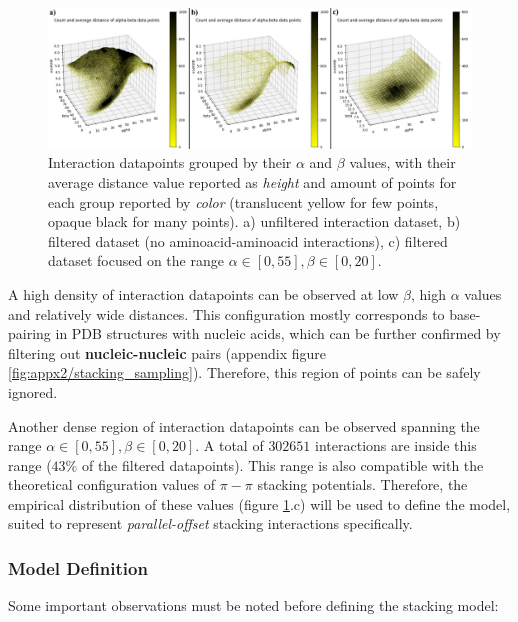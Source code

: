       \begin{figure}[H]
        \centering
        \includegraphics[width=1\textwidth]{figures/results/stacking_sampling.png}
        \caption{\label{fig:results/stacking_sampling} Interaction datapoints grouped by their $\alpha$ and $\beta$ values, with their average distance value reported as \textit{height} and amount of points for each group reported by \textit{color} (translucent yellow for few points, opaque black for many points). a) unfiltered interaction dataset, b) filtered dataset (no aminoacid-aminoacid interactions), c) filtered dataset focused on the range $\alpha \in [0,55], \beta \in [0,20]$.}
      \end{figure}

      A high density of interaction datapoints can be observed at low $\beta$, high $\alpha$ values and relatively wide distances. This configuration mostly corresponds to base-pairing in PDB structures with nucleic acids, which can be further confirmed by filtering out \textbf{nucleic-nucleic} pairs (appendix figure \ref{fig:appx2/stacking_sampling}). Therefore, this region of points can be safely ignored.

      Another dense region of interaction datapoints can be observed spanning the range $\alpha \in [0,55], \beta \in [0,20]$. A total of $302651$ interactions are inside this range ($43 \%$ of the filtered datapoints). This range is also compatible with the theoretical configuration values of $\pi-\pi$ stacking potentials. Therefore, the empirical distribution of these values (figure \ref{fig:results/stacking_sampling}.c) will be used to define the model, suited to represent \textit{parallel-offset} stacking interactions specifically.

    \subsubsection{Model Definition}
      Some important observations must be noted before defining the stacking model:

